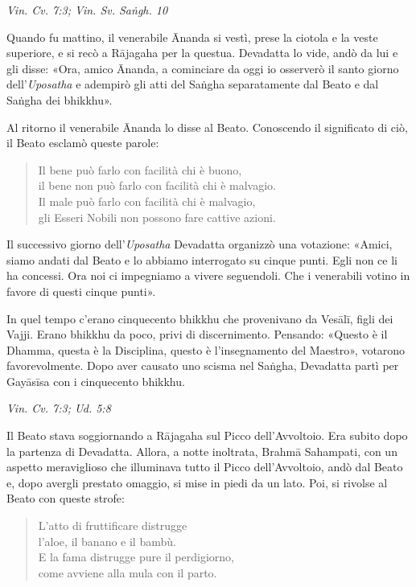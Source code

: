 \emph{Vin. Cv. 7:3; Vin. Sv. Saṅgh. 10}


Quando fu mattino, il venerabile Ānanda si vestì, prese la ciotola e la
veste superiore, e si recò a Rājagaha per la questua. Devadatta lo vide,
andò da lui e gli disse: «Ora, amico Ānanda, a cominciare da oggi io
osserverò il santo giorno dell’\emph{Uposatha} e adempirò gli atti del Saṅgha
separatamente dal Beato e dal Saṅgha dei bhikkhu».


Al ritorno il venerabile Ānanda lo disse al Beato. Conoscendo il
significato di ciò, il Beato esclamò queste parole:


\begin{quote}
Il bene può farlo con facilità chi è buono, \\
il bene non può farlo con facilità chi è malvagio. \\
Il male può farlo con facilità chi è malvagio, \\
gli Esseri Nobili non possono fare cattive azioni.
\end{quote}

Il successivo giorno dell’\emph{Uposatha} Devadatta organizzò una votazione:
«Amici, siamo andati dal Beato e lo abbiamo interrogato su cinque punti.
Egli non ce li ha concessi. Ora noi ci impegniamo a vivere seguendoli.
Che i venerabili votino in favore di questi cinque punti».


In quel tempo c’erano cinquecento bhikkhu che provenivano da Vesālī,
figli dei Vajji. Erano bhikkhu da poco, privi di discernimento.
Pensando: «Questo è il Dhamma, questa è la Disciplina, questo è
l’insegnamento del Maestro», votarono favorevolmente. Dopo aver causato
uno scisma nel Saṅgha, Devadatta partì per Gayāsīsa con i cinquecento
bhikkhu.


\emph{Vin. Cv. 7:3; Ud. 5:8}


 Il Beato stava soggiornando a Rājagaha sul Picco
dell’Avvoltoio. Era subito dopo la partenza di Devadatta. Allora, a
notte inoltrata, Brahmā Sahampati, con un aspetto meraviglioso che
illuminava tutto il Picco dell’Avvoltoio, andò dal Beato e, dopo avergli
prestato omaggio, si mise in piedi da un lato. Poi, si rivolse al Beato
con queste strofe:


\begin{quote}
L’atto di fruttificare distrugge \\
l’aloe, il banano e il bambù. \\
E la fama distrugge pure il perdigiorno, \\
come avviene alla mula con il parto.
\end{quote}

